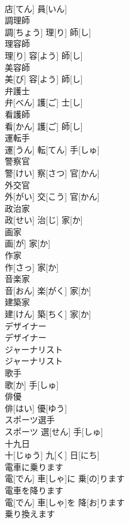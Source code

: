 \documentclass[8pt]{extreport}
\begin{document}
\begin{CJK}{UTF8}{min}
\\	店[てん] 員[いん]		
\\	調理師	
\\	調[ちょう] 理[り] 師[し]		
\\	理容師	
\\	理[り] 容[よう] 師[し]		
\\	美容師	
\\	美[び] 容[よう] 師[し]		
\\	弁護士	
\\	弁[べん] 護[ご] 士[し]		
\\	看護師	
\\	看[かん] 護[ご] 師[し]		
\\	運転手	
\\	運[うん] 転[てん] 手[しゅ]		
\\	警察官	
\\	警[けい] 察[さつ] 官[かん]		
\\	外交官	
\\	外[がい] 交[こう] 官[かん]		
\\	政治家	
\\	政[せい] 治[じ] 家[か]		
\\	画家	
\\	画[が] 家[か]		
\\	作家	
\\	作[さっ] 家[か]		
\\	音楽家	
\\	音[おん] 楽[がく] 家[か]		
\\	建築家	
\\	建[けん] 築[ちく] 家[か]		
\\	デザイナー	
\\	デザイナー		
\\	ジャーナリスト	
\\	ジャーナリスト		
\\	歌手	
\\	歌[か] 手[しゅ]		
\\	俳優	
\\	俳[はい] 優[ゆう]		
\\	スポーツ選手	
\\	スポーツ 選[せん] 手[しゅ]		
\\	十九日	
\\	十[じゅう] 九[く] 日[にち]		
\\	電車に乗ります	
\\	電[でん] 車[しゃ]に 乗[の]ります		
\\	電車を降ります	
\\	電[でん] 車[しゃ]を 降[お]ります		
\\	乗り換えます	

\end{CJK}
\end{document}
